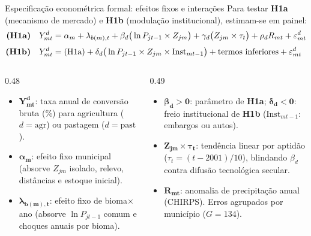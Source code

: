 \documentclass[aspectratio=169,10.5pt]{beamer}
\newcommand{\fonte}[1]{\par\vspace{1mm}{\fontsize{6.5}{7.5}\selectfont\color{gray}Fonte: #1\par}}
\begin{document}
\begin{frame}{Especificação econométrica formal: efeitos fixos e interações}
\fontsize{8.5}{10.5}\selectfont
Para testar \textbf{H1a} (mecanismo de mercado) e \textbf{H1b} (modulação institucional), estimam-se em painel:
\vspace{-1.5mm}
\[
\begin{aligned}
\text{\textbf{(H1a)}}\quad Y_{mt}^d &= \alpha_m + \lambda_{b(m),t} + \beta_d \big(\ln P_{jt-1} \times Z_{jm}\big) + \gamma_d \big(Z_{jm} \times \tau_t\big) + \rho_d R_{mt} + \varepsilon_{mt}^d \\[1mm]
\text{\textbf{(H1b)}}\quad Y_{mt}^d &= \text{(H1a)} + \delta_d \big(\ln P_{jt-1} \times Z_{jm} \times \text{Inst}_{mt-1}\big) + \text{termos inferiores} + \varepsilon_{mt}^d
\end{aligned}
\]
\vspace{-1mm}
\begin{columns}[T]
\begin{column}{0.48\textwidth}
\fontsize{8}{9.6}\selectfont
\begin{itemize}
    \setlength{\itemsep}{0.9mm}
    \item $\mathbf{Y_{mt}^d}$: taxa anual de conversão bruta (\%) para agricultura ($d=\text{agr}$) ou pastagem ($d=\text{past}$).
    \item $\mathbf{\alpha_m}$: efeito fixo municipal (absorve $Z_{jm}$ isolado, relevo, distâncias e estoque inicial).
    \item $\mathbf{\lambda_{b(m),t}}$: efeito fixo de bioma$\times$ano (absorve $\ln P_{jt-1}$ comum e choques anuais por bioma).
\end{itemize}
\end{column}

\begin{column}{0.49\textwidth}
\fontsize{8}{9.6}\selectfont
\begin{itemize}
    \setlength{\itemsep}{0.9mm}
    \item $\mathbf{\beta_d > 0}$: parâmetro de \textbf{H1a}; $\mathbf{\delta_d < 0}$: freio institucional de \textbf{H1b} ($\text{Inst}_{mt-1}$: embargos ou autos).
    \item $\mathbf{Z_{jm} \times \tau_t}$: tendência linear por aptidão ($\tau_t = (t-2001)/10$), blindando $\beta_d$ contra difusão tecnológica secular.
    \item $\mathbf{R_{mt}}$: anomalia de precipitação anual (CHIRPS). Erros agrupados por município ($G=134$).
\end{itemize}
\end{column}
\end{columns}
\end{frame}
\end{document}
